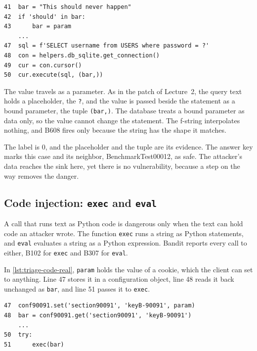 \noindent\begin{minipage}{\linewidth}
\begin{lstlisting}[breakatwhitespace=true, basicstyle=\ttfamily\footnotesize, caption={A false positive from the same rule: BenchmarkTest00011, lines 41 to 50.}, label=lst:triage-sql-false]
41  bar = "This should never happen"
42  if 'should' in bar:
43      bar = param
    ...
47  sql = f'SELECT username from USERS where password = ?'
48  con = helpers.db_sqlite.get_connection()
49  cur = con.cursor()
50  cur.execute(sql, (bar,))
\end{lstlisting}
\end{minipage}

The value travels as a parameter. As in the patch of Lecture~2, the query text holds a placeholder,
the \texttt{?}, and the value is passed beside the statement as a bound parameter, the tuple
\texttt{(bar,)}. The database treats a bound parameter as data only, so the value cannot change the
statement. The f-string interpolates nothing, and B608 fires only because the string has the shape
it matches.

The label is 0, and the placeholder and the tuple are its evidence. The answer key marks this case
and its neighbor, BenchmarkTest00012, as safe. The attacker's data reaches the sink here, yet there
is no vulnerability, because a step on the way removes the danger.

\subsection{Code injection: \texttt{exec} and \texttt{eval}}
\label{sec:triage-code}

A call that runs text as Python code is dangerous only when the text can hold code an attacker
wrote. The function \texttt{exec} runs a string as Python statements, and \texttt{eval} evaluates a
string as a Python expression. Bandit reports every call to either, B102 for \texttt{exec} and B307
for \texttt{eval}.

In \cref{lst:triage-code-real}, \texttt{param} holds the value of a cookie, which the client can set
to anything. Line 47 stores it in a configuration object, line 48 reads it back unchanged as
\texttt{bar}, and line 51 passes it to \texttt{exec}.

\noindent\begin{minipage}{\linewidth}
\begin{lstlisting}[breakatwhitespace=true, basicstyle=\ttfamily\footnotesize, caption={A real code injection: BenchmarkTest00074, lines 47 to 51.}, label=lst:triage-code-real]
47  conf90091.set('section90091', 'keyB-90091', param)
48  bar = conf90091.get('section90091', 'keyB-90091')
    ...
50  try:
51      exec(bar)
\end{lstlisting}
\end{minipage}

